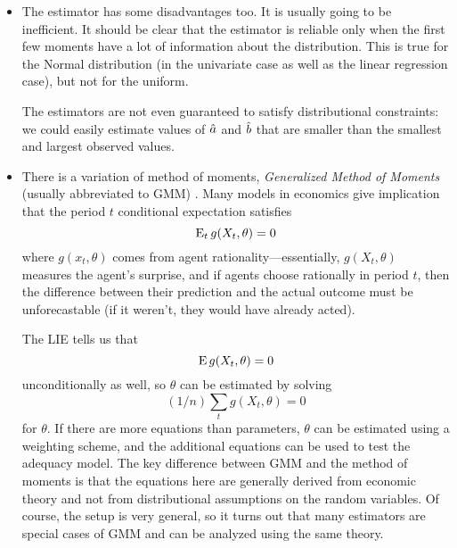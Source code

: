 \begin{itemize}
\item The estimator has some disadvantages too.  It is usually going
  to be inefficient.  It should be clear that the estimator is
  reliable only when the first few moments have a lot of information
  about the distribution.  This is true for the Normal distribution
  (in the univariate case as well as the linear regression case), but
  not for the uniform.

  The estimators are not even guaranteed to satisfy distributional
  constraints: we could easily estimate values of $\hat{a}$ and $\hat{b}$ that
  are smaller than the smallest and largest observed values.

\item There is a variation of method of moments, \emph{Generalized
    Method of Moments} (usually abbreviated to GMM) \citep[derived
  by][as part of his Ph.D. dissertation]{Han:82}.  Many models in
  economics give implication that the period $t$ conditional
  expectation satisfies 
  \begin{equation*}
    \operatorname{E}_t g(X_t, \theta) = 0
  \end{equation*}
  where $g(x_t, \theta)$ comes from agent rationality---essentially,
  $g(X_t,\theta)$ measures the agent's surprise, and if agents choose
  rationally in period $t$, then the difference between their
  prediction and the actual outcome must be unforecastable (if it
  weren't, they would have already acted).

  The LIE tells us that
  \begin{equation*}
    \operatorname{E} g(X_t, \theta) = 0
  \end{equation*}
  unconditionally as well, so $\theta$ can be estimated by solving
  \begin{equation*}
    (1/n) \sum_t g(X_t, \theta) = 0
  \end{equation*}
  for $\theta$.  If there are more equations than parameters, $\theta$ can be
  estimated using a weighting scheme, and the additional equations can
  be used to test the adequacy model.  The key difference between GMM
  and the method of moments is that the equations here are generally
  derived from economic theory and not from distributional assumptions
  on the random variables.  Of course, the setup is very general, so
  it turns out that many estimators are special cases of GMM and can
  be analyzed using the same theory.

\end{itemize}

